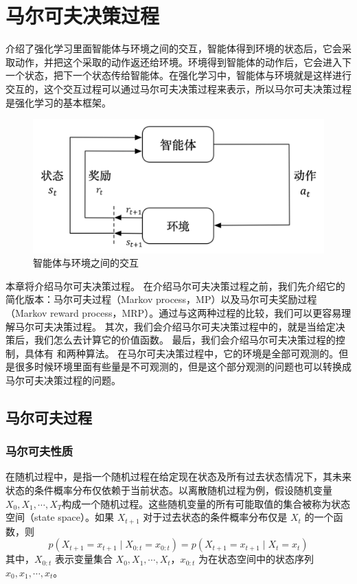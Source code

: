 \section{马尔可夫决策过程}

 介绍了强化学习里面智能体与环境之间的交互，智能体得到环境的状态后，它会采取动作，并把这个采取的动作返还给环境。环境得到智能体的动作后，它会进入下一个状态，把下一个状态传给智能体。在强化学习中，智能体与环境就是这样进行交互的，这个交互过程可以通过马尔可夫决策过程来表示，所以马尔可夫决策过程是强化学习的基本框架。

\begin{figure}[hbt]
  \centering
  \includegraphics[width=0.5\linewidth]{res/ch2/2.2}
  \caption{智能体与环境之间的交互}
  \label{fig:rl_pic}
\end{figure}

本章将介绍马尔可夫决策过程。
在介绍马尔可夫决策过程之前，我们先介绍它的简化版本：马尔可夫过程（Markov process，MP）以及马尔可夫奖励过程（Markov reward process，MRP）。通过与这两种过程的比较，我们可以更容易理解马尔可夫决策过程。
其次，我们会介绍马尔可夫决策过程中的，就是当给定决策后，我们怎么去计算它的价值函数。
最后，我们会介绍马尔可夫决策过程的控制，具体有 和两种算法。
在马尔可夫决策过程中，它的环境是全部可观测的。但是很多时候环境里面有些量是不可观测的，但是这个部分观测的问题也可以转换成马尔可夫决策过程的问题。

\subsection{马尔可夫过程} 
\subsubsection{马尔可夫性质}
在随机过程中，是指一个随机过程在给定现在状态及所有过去状态情况下，其未来状态的条件概率分布仅依赖于当前状态。以离散随机过程为例，假设随机变量 $X_0,X_1,\cdots,X_T$构成一个随机过程。这些随机变量的所有可能取值的集合被称为状态空间（state space）。如果 $X_{t+1}$ 对于过去状态的条件概率分布仅是 $X_t$ 的一个函数，则
\begin{equation}
  \label{eq:}
  p\left(X_{t+1}=x_{t+1} \mid X_{0:t}=x_{0: t}\right)=p\left(X_{t+1}=x_{t+1} \mid X_{t}=x_{t}\right)
\end{equation}
其中，$X_{0:t}$ 表示变量集合 $X_{0}, X_{1}, \cdots, X_{t}$，$x_{0: t}$ 为在状态空间中的状态序列 $x_{0}, x_{1}, \cdots, x_{t}$。

